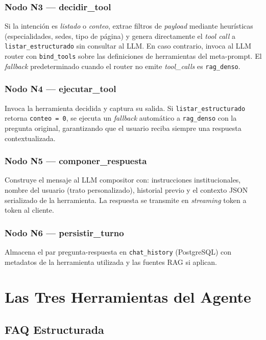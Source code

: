 \documentclass[conference]{IEEEtran}
\newcommand{\code}[1]{\texttt{\small #1}}
\begin{document}
\subsubsection{Nodo N3 — decidir\_tool}
Si la intención es \textit{listado} o \textit{conteo}, extrae filtros de
\textit{payload} mediante heurísticas (especialidades, sedes, tipo de página)
y genera directamente el \textit{tool call} a \code{listar\_estructurado} sin
consultar al LLM. En caso contrario, invoca al LLM router con
\code{bind\_tools} sobre las definiciones de herramientas del meta-prompt.
El \textit{fallback} predeterminado cuando el router no emite
\textit{tool\_calls} es \code{rag\_denso}.

\subsubsection{Nodo N4 — ejecutar\_tool}
Invoca la herramienta decidida y captura su salida. Si
\code{listar\_estructurado} retorna \code{conteo = 0}, se ejecuta un
\textit{fallback} automático a \code{rag\_denso} con la pregunta original,
garantizando que el usuario reciba siempre una respuesta contextualizada.

\subsubsection{Nodo N5 — componer\_respuesta}
Construye el mensaje al LLM compositor con: instrucciones institucionales,
nombre del usuario (trato personalizado), historial previo y el contexto
JSON serializado de la herramienta. La respuesta se transmite en
\textit{streaming} token a token al cliente.

\subsubsection{Nodo N6 — persistir\_turno}
Almacena el par pregunta-respuesta en \code{chat\_history} (PostgreSQL) con
metadatos de la herramienta utilizada y las fuentes RAG si aplican.

\section{Las Tres Herramientas del Agente}
\label{sec:tools}

\subsection{FAQ Estructurada}
\end{document}
